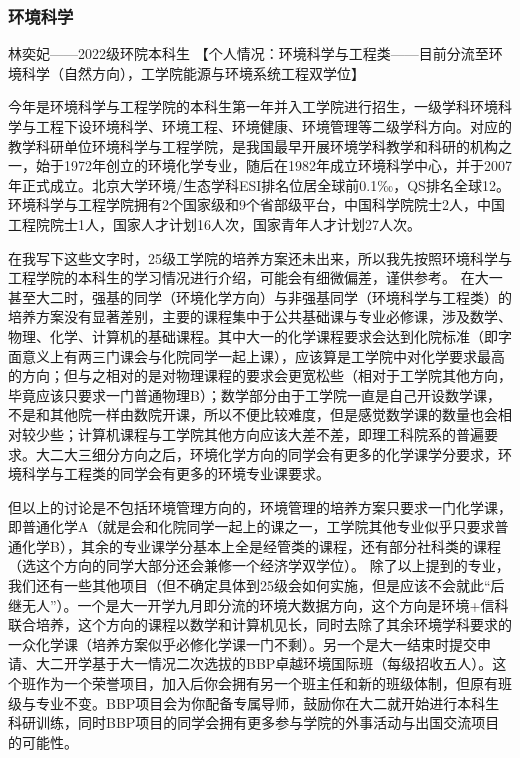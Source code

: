 \documentclass[11pt,oneside]{book}
\begin{document}
\subsubsection{环境科学}
林奕妃——2022级环院本科生
【个人情况：环境科学与工程类——目前分流至环境科学（自然方向），工学院能源与环境系统工程双学位】

今年是环境科学与工程学院的本科生第一年并入工学院进行招生，一级学科环境科学与工程下设环境科学、环境工程、环境健康、环境管理等二级学科方向。对应的教学科研单位环境科学与工程学院，是我国最早开展环境学科教学和科研的机构之一，始于1972年创立的环境化学专业，随后在1982年成立环境科学中心，并于2007年正式成立。北京大学环境/生态学科ESI排名位居全球前0.1‰，QS排名全球12。环境科学与工程学院拥有2个国家级和9个省部级平台，中国科学院院士2人，中国工程院院士1人，国家人才计划16人次，国家青年人才计划27人次。

在我写下这些文字时，25级工学院的培养方案还未出来，所以我先按照环境科学与工程学院的本科生的学习情况进行介绍，可能会有细微偏差，谨供参考。
在大一甚至大二时，强基的同学（环境化学方向）与非强基同学（环境科学与工程类）的培养方案没有显著差别，主要的课程集中于公共基础课与专业必修课，涉及数学、物理、化学、计算机的基础课程。其中大一的化学课程要求会达到化院标准（即字面意义上有两三门课会与化院同学一起上课），应该算是工学院中对化学要求最高的方向；但与之相对的是对物理课程的要求会更宽松些（相对于工学院其他方向，毕竟应该只要求一门普通物理B）；数学部分由于工学院一直是自己开设数学课，不是和其他院一样由数院开课，所以不便比较难度，但是感觉数学课的数量也会相对较少些；计算机课程与工学院其他方向应该大差不差，即理工科院系的普遍要求。大二大三细分方向之后，环境化学方向的同学会有更多的化学课学分要求，环境科学与工程类的同学会有更多的环境专业课要求。

但以上的讨论是不包括环境管理方向的，环境管理的培养方案只要求一门化学课，即普通化学A（就是会和化院同学一起上的课之一，工学院其他专业似乎只要求普通化学B），其余的专业课学分基本上全是经管类的课程，还有部分社科类的课程（选这个方向的同学大部分还会兼修一个经济学双学位）。
除了以上提到的专业，我们还有一些其他项目（但不确定具体到25级会如何实施，但是应该不会就此“后继无人”）。一个是大一开学九月即分流的环境大数据方向，这个方向是环境+信科联合培养，这个方向的课程以数学和计算机见长，同时去除了其余环境学科要求的一众化学课（培养方案似乎必修化学课一门不剩）。另一个是大一结束时提交申请、大二开学基于大一情况二次选拔的BBP卓越环境国际班（每级招收五人）。这个班作为一个荣誉项目，加入后你会拥有另一个班主任和新的班级体制，但原有班级与专业不变。BBP项目会为你配备专属导师，鼓励你在大二就开始进行本科生科研训练，同时BBP项目的同学会拥有更多参与学院的外事活动与出国交流项目的可能性。
\end{document}
